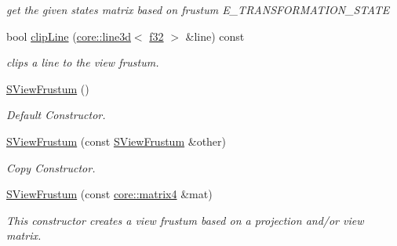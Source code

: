 \begin{DoxyCompactItemize}
\begin{DoxyCompactList}\small\item\em get the given state\textquotesingle{}s matrix based on frustum E\+\_\+\+T\+R\+A\+N\+S\+F\+O\+R\+M\+A\+T\+I\+O\+N\+\_\+\+S\+T\+A\+TE \end{DoxyCompactList}\item 
bool \hyperlink{structirr_1_1scene_1_1SViewFrustum_a8d4a42afc55dde3b193ad0b1311f9dfe}{clip\+Line} (\hyperlink{classirr_1_1core_1_1line3d}{core\+::line3d}$<$ \hyperlink{namespaceirr_a0277be98d67dc26ff93b1a6a1d086b07}{f32} $>$ \&line) const
\begin{DoxyCompactList}\small\item\em clips a line to the view frustum. \end{DoxyCompactList}\item 
\mbox{\label{structirr_1_1scene_1_1SViewFrustum_a7052e88c612bd1239115929e94e6210d}} 
\hyperlink{structirr_1_1scene_1_1SViewFrustum_a7052e88c612bd1239115929e94e6210d}{S\+View\+Frustum} ()
\begin{DoxyCompactList}\small\item\em Default Constructor. \end{DoxyCompactList}\item 
\mbox{\label{structirr_1_1scene_1_1SViewFrustum_aa7cfed3ee9feee79efe02d26f3b14b0c}} 
\hyperlink{structirr_1_1scene_1_1SViewFrustum_aa7cfed3ee9feee79efe02d26f3b14b0c}{S\+View\+Frustum} (const \hyperlink{structirr_1_1scene_1_1SViewFrustum}{S\+View\+Frustum} \&other)
\begin{DoxyCompactList}\small\item\em Copy Constructor. \end{DoxyCompactList}\item 
\mbox{\label{structirr_1_1scene_1_1SViewFrustum_acfcbb01f1e26f73ee1d9c7695302a508}} 
\hyperlink{structirr_1_1scene_1_1SViewFrustum_acfcbb01f1e26f73ee1d9c7695302a508}{S\+View\+Frustum} (const \hyperlink{namespaceirr_1_1core_a4c9d4e29899535971052810954a14431}{core\+::matrix4} \&mat)
\begin{DoxyCompactList}\small\item\em This constructor creates a view frustum based on a projection and/or view matrix. \end{DoxyCompactList}\item 

\end{DoxyCompactItemize}
